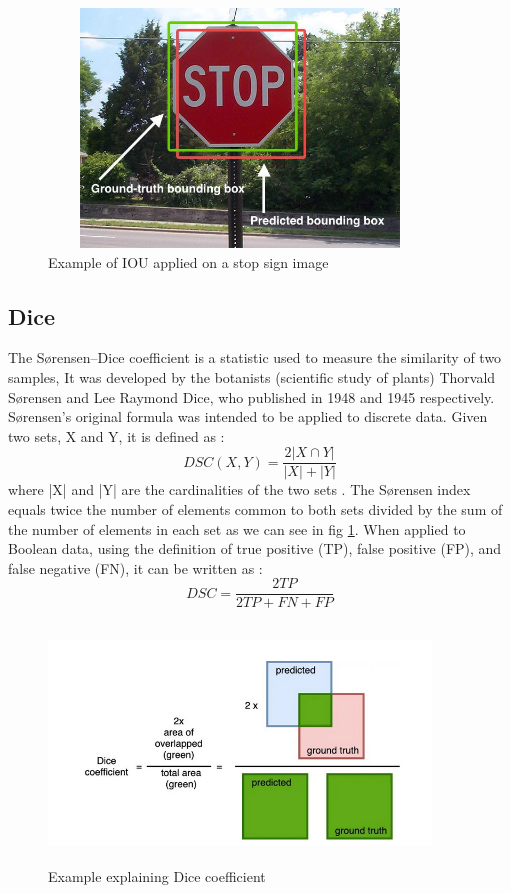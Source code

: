 \begin{figure}[H]
\centering
  \vspace{-0.1in}
    \centerline{\includegraphics[width = 4in, height = 2.5in]{../images/exampleIOU.jpg}}
    \caption{Example of IOU applied on a stop sign image}
\end{figure}

\subsection{Dice}
The Sørensen–Dice coefficient is a statistic used to measure the similarity of two samples, It was developed by the botanists (scientific study of plants) Thorvald Sørensen and Lee Raymond Dice, who published in 1948 and 1945 respectively.\\
Sørensen's original formula was intended to be applied to discrete data. Given two sets, X and Y, it is defined as :
\begin{equation}
    DSC(X, Y) = \frac{2 | X \cap Y |}{| X |  +  | Y |}
\end{equation}
where |X| and |Y| are the cardinalities of the two sets . The Sørensen index equals twice the number of elements common to both sets divided by the sum of the number of elements in each set as we can see in fig \ref{fig:DSC_EX}. 
When applied to Boolean data, using the definition of true positive (TP), false positive (FP), and false negative (FN), it can be written as :
\begin{equation}
    DSC = \frac{2 TP}{2 TP + FN + FP}
\end{equation}

\begin{figure}[H]
\centering
  \vspace{-0.1in}
    \centerline{\includegraphics[width = 4in, height = 2.5in]{../images/DSC.png}}
    \caption{Example explaining Dice coefficient}
    \label{fig:DSC_EX}
\end{figure}

